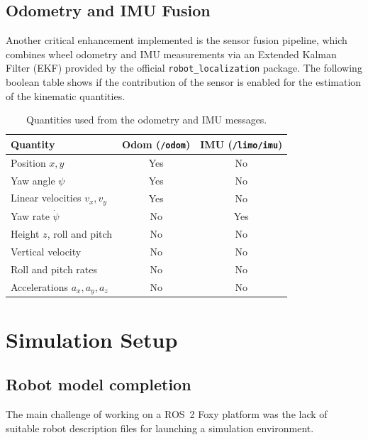 \documentclass[a4paper,11pt,oneside]{book}
\begin{document}
\subsection{Odometry and IMU Fusion}

Another critical enhancement implemented is the sensor fusion pipeline, which combines wheel odometry and IMU measurements via an Extended Kalman Filter (EKF) provided by the official \texttt{robot\_localization} package. The following boolean table shows if the contribution of the sensor is enabled for the estimation of the kinematic quantities.

\begin{table}[H]
    \centering
    \begin{tabular}{lcc}
        \toprule
        \textbf{Quantity} & \textbf{Odom (\texttt{/odom})}
                         & \textbf{IMU (\texttt{/limo/imu})} \\
        \midrule
        Position $x, y$                       & Yes & No \\
        Yaw angle $\psi$                      & Yes & No \\
        Linear velocities $v_x, v_y$          & Yes & No \\
        Yaw rate $\dot{\psi}$                 & No  & Yes\\
        Height $z$, roll and pitch            & No  & No \\
        Vertical velocity                    & No  & No \\
        Roll and pitch rates                 & No  & No \\
        Accelerations $a_x, a_y, a_z$          & No  & No \\
        \bottomrule
    \end{tabular}
    \caption{Quantities used from the odometry and IMU messages.}
    \label{tab:odom_imu}
\end{table}

\section{Simulation Setup}

\subsection{Robot model completion}

The main challenge of working on a ROS~2 Foxy platform was the lack
of suitable robot description files for launching a simulation
environment.
\end{document}
